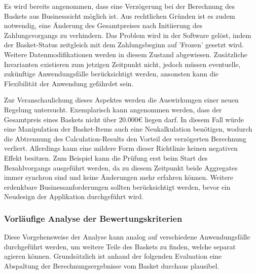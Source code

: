Es wird bereits angenommen, dass eine Verzögerung bei der Berechnung des Baskets aus Businesssicht möglich ist. Aus rechtlichen Gründen ist es zudem notwendig, eine Änderung des Gesamtpreises nach Initiierung des Zahlungsvorgangs zu verhindern. Das Problem wird in der Software gelöst, indem der Basket-Status zeitgleich mit dem Zahlungsbeginn auf 'Frozen' gesetzt wird. Weitere Datenmodifikationen werden in diesem Zustand abgewiesen. Zusätzliche Invarianten existieren zum jetzigen Zeitpunkt nicht, jedoch müssen eventuelle, zukünftige Anwendungsfälle berücksichtigt werden, ansonsten kann die Flexibilität der Anwendung gefährdet sein. 

Zur Veranschaulichung dieses Aspektes werden die Auswirkungen einer neuen Regelung untersucht. Exemplarisch kann angenommen werden, dass der Gesamtpreis eines Baskets nicht über 20.000€ liegen darf. In diesem Fall würde eine Manipulation der Basket-Items auch eine Neukalkulation benötigen, wodurch die Abtrennung des Calculation-Results den Vorteil der verzögerten Berechnung verliert. Allerdings kann eine mildere Form dieser Richtlinie keinen negativen Effekt besitzen. Zum Beispiel kann die Prüfung erst beim Start des Bezahlvorgangs ausgeführt werden, da zu diesem Zeitpunkt beide Aggregates immer synchron sind und keine Änderungen mehr erfahren können. Weitere erdenkbare Businessanforderungen sollten berücksichtigt werden, bevor ein Neudesign der Applikation durchgeführt wird.

\pagebreak

\subsubsection{Vorläufige Analyse der Bewertungskriterien}

Diese Vorgehensweise der Analyse kann analog auf verschiedene Anwendungsfälle durchgeführt werden, um weitere Teile des Baskets zu finden, welche separat agieren können. Grundsätzlich ist anhand der folgenden Evaluation eine Abspaltung der Berechnungsergebnisse vom Basket durchaus plausibel.

